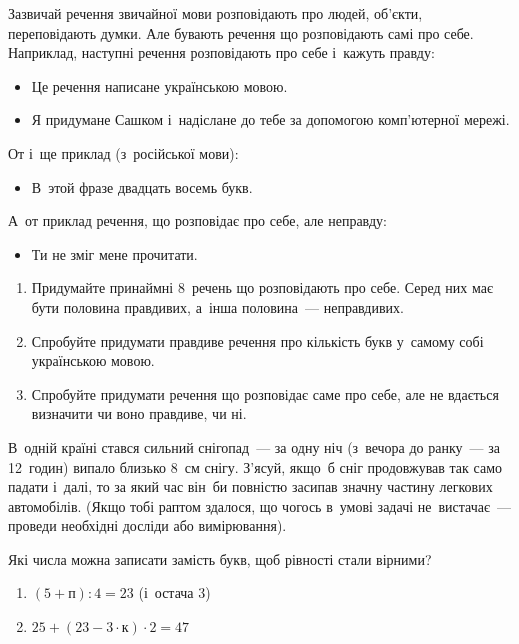 \problem
Зазвичай речення звичайної мови розповідають про людей, об'єкти,
переповідають думки.
Але бувають речення що розповідають самі про себе.
Наприклад, наступні речення розповідають про себе і~кажуть правду:
\begin{itemize}
    \item Це речення написане українською мовою.
    \item Я придумане Сашком і~надіслане до тебе
    за допомогою комп’ютерної мережі.
\end{itemize}
От і~ще приклад (з~російської мови):
\begin{itemize}
    \item В~этой фразе двадцать восемь букв.
\end{itemize}
А~от приклад речення, що розповідає про себе, але неправду:
\begin{itemize}
    \item Ти не зміг мене прочитати.
\end{itemize}

\begin{enumerate}
    \item Придумайте принаймні 8~речень що розповідають про себе.
    Серед них має бути половина правдивих, а~інша половина~--- неправдивих.
    \item Спробуйте придумати правдиве речення про кількість букв
    у~самому собі українською мовою. 
    \item Спробуйте придумати речення що розповідає саме про себе,
    але не вдається визначити чи воно правдиве, чи ні.
\end{enumerate}


\problem
В~одній країні стався сильний снігопад~--- за одну ніч
(з~вечора до ранку~--- за 12~годин) випало близько 8~см снігу.
З'ясуй, якщо~б сніг продовжував так само падати і~далі,
то за який час він~би повністю засипав значну частину легкових автомобілів.
(Якщо тобі раптом здалося, що чогось в~умові задачі не~вистачає~---
проведи необхідні досліди або вимірювання).


\problem
Які числа можна записати замість букв, щоб рівності стали вірними?
\begin{enumerate}
    \item $(5 + \textit{п}) : 4 = 23$ (і~остача 3)
    \item $25 + (23 - 3 \cdot \textit{к}) \cdot 2 = 47$
\end{enumerate}


